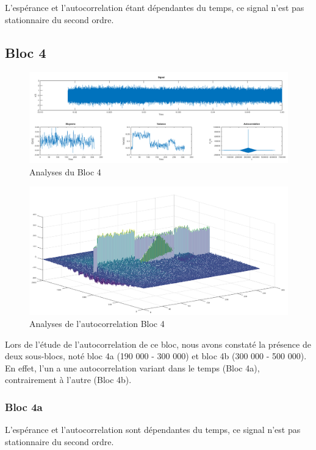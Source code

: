 \documentclass[french, a4paper, 12pt, openany]{book}
\begin{document}
	L'espérance et l'autocorrelation étant dépendantes du temps, ce signal n'est pas stationnaire du second ordre.
  \subsection{Bloc 4}

	\begin{figure}[ht]
    \begin{center}
    \includegraphics[scale=0.25]{images/SignalBloc4.png}
    \end{center}
    \caption{Analyses du Bloc 4}
    \label{Analyses du Bloc 4}
  \end{figure}

	\begin{figure}[ht]
		\begin{center}
		\includegraphics[scale=0.25]{images/AutoCorrBloc4.png}
		\end{center}
		\caption{Analyses de l'autocorrelation Bloc 4}
		\label{Analyses de l'autocorrelation Bloc 4}
	\end{figure}

	Lors de l'étude de l'autocorrelation de ce bloc, nous avons constaté la présence de deux sous-blocs, noté bloc 4a (190 000 - 300 000) et bloc 4b (300 000 - 500 000). En effet, l'un a une autocorrelation variant dans le temps (Bloc 4a), contrairement à l'autre (Bloc 4b).

	\subsubsection{Bloc 4a}
	L'espérance et l'autocorrelation sont dépendantes du temps, ce signal n'est pas stationnaire du second ordre.
\end{document}
